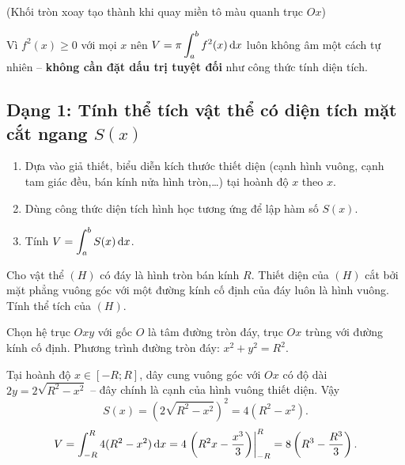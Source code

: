 \begin{center}

\small (Khối tròn xoay tạo thành khi quay miền tô màu quanh trục $Ox$)
\end{center}

\begin{hopchuy}
Vì $f^2(x)\ge0$ với mọi $x$ nên $\displaystyle V=\pi\int_a^b f^2(x)\,\mathrm{d}x$ luôn không âm một cách tự nhiên -- \textbf{không cần đặt dấu trị tuyệt đối} như công thức tính diện tích.
\end{hopchuy}

\newpage
\subsection{Dạng 1: Tính thể tích vật thể có diện tích mặt cắt ngang \texorpdfstring{$S(x)$}{S(x)}}

\begin{hopphuongphap}
\begin{enumerate}[leftmargin=1cm]
  \item Dựa vào giả thiết, biểu diễn kích thước thiết diện (cạnh hình vuông, cạnh tam giác đều, bán kính nửa hình tròn,\ldots) tại hoành độ $x$ theo $x$.
  \item Dùng công thức diện tích hình học tương ứng để lập hàm số $S(x)$.
  \item Tính $\displaystyle V=\int_a^b S(x)\,\mathrm{d}x$.
\end{enumerate}
\end{hopphuongphap}

\begin{hopvidu}
Cho vật thể $(H)$ có đáy là hình tròn bán kính $R$. Thiết diện của $(H)$ cắt bởi mặt phẳng vuông góc với một đường kính cố định của đáy luôn là hình vuông. Tính thể tích của $(H)$.
\end{hopvidu}
\begin{loigiai}
Chọn hệ trục $Oxy$ với gốc $O$ là tâm đường tròn đáy, trục $Ox$ trùng với đường kính cố định. Phương trình đường tròn đáy: $x^2+y^2=R^2$.

Tại hoành độ $x\in[-R;R]$, dây cung vuông góc với $Ox$ có độ dài $2y=2\sqrt{R^2-x^2}$ -- đây chính là cạnh của hình vuông thiết diện. Vậy
\[
S(x) = \left(2\sqrt{R^2-x^2}\right)^2 = 4(R^2-x^2).
\]
\[
V=\int_{-R}^{R} 4(R^2-x^2)\,\mathrm{d}x = 4\left.\left(R^2x-\frac{x^3}{3}\right)\right|_{-R}^{R} = 8\left(R^3-\frac{R^3}{3}\right).
\]
\end{loigiai}

